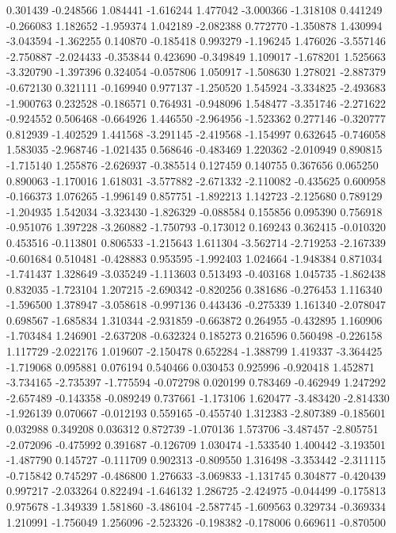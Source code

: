 0.301439
-0.248566
1.084441
-1.616244
1.477042
-3.000366
-1.318108
0.441249
-0.266083
1.182652
-1.959374
1.042189
-2.082388
0.772770
-1.350878
1.430994
-3.043594
-1.362255
0.140870
-0.185418
0.993279
-1.196245
1.476026
-3.557146
-2.750887
-2.024433
-0.353844
0.423690
-0.349849
1.109017
-1.678201
1.525663
-3.320790
-1.397396
0.324054
-0.057806
1.050917
-1.508630
1.278021
-2.887379
-0.672130
0.321111
-0.169940
0.977137
-1.250520
1.545924
-3.334825
-2.493683
-1.900763
0.232528
-0.186571
0.764931
-0.948096
1.548477
-3.351746
-2.271622
-0.924552
0.506468
-0.664926
1.446550
-2.964956
-1.523362
0.277146
-0.320777
0.812939
-1.402529
1.441568
-3.291145
-2.419568
-1.154997
0.632645
-0.746058
1.583035
-2.968746
-1.021435
0.568646
-0.483469
1.220362
-2.010949
0.890815
-1.715140
1.255876
-2.626937
-0.385514
0.127459
0.140755
0.367656
0.065250
0.890063
-1.170016
1.618031
-3.577882
-2.671332
-2.110082
-0.435625
0.600958
-0.166373
1.076265
-1.996149
0.857751
-1.892213
1.142723
-2.125680
0.789129
-1.204935
1.542034
-3.323430
-1.826329
-0.088584
0.155856
0.095390
0.756918
-0.951076
1.397228
-3.260882
-1.750793
-0.173012
0.169243
0.362415
-0.010320
0.453516
-0.113801
0.806533
-1.215643
1.611304
-3.562714
-2.719253
-2.167339
-0.601684
0.510481
-0.428883
0.953595
-1.992403
1.024664
-1.948384
0.871034
-1.741437
1.328649
-3.035249
-1.113603
0.513493
-0.403168
1.045735
-1.862438
0.832035
-1.723104
1.207215
-2.690342
-0.820256
0.381686
-0.276453
1.116340
-1.596500
1.378947
-3.058618
-0.997136
0.443436
-0.275339
1.161340
-2.078047
0.698567
-1.685834
1.310344
-2.931859
-0.663872
0.264955
-0.432895
1.160906
-1.703484
1.246901
-2.637208
-0.632324
0.185273
0.216596
0.560498
-0.226158
1.117729
-2.022176
1.019607
-2.150478
0.652284
-1.388799
1.419337
-3.364425
-1.719068
0.095881
0.076194
0.540466
0.030453
0.925996
-0.920418
1.452871
-3.734165
-2.735397
-1.775594
-0.072798
0.020199
0.783469
-0.462949
1.247292
-2.657489
-0.143358
-0.089249
0.737661
-1.173106
1.620477
-3.483420
-2.814330
-1.926139
0.070667
-0.012193
0.559165
-0.455740
1.312383
-2.807389
-0.185601
0.032988
0.349208
0.036312
0.872739
-1.070136
1.573706
-3.487457
-2.805751
-2.072096
-0.475992
0.391687
-0.126709
1.030474
-1.533540
1.400442
-3.193501
-1.487790
0.145727
-0.111709
0.902313
-0.809550
1.316498
-3.353442
-2.311115
-0.715842
0.745297
-0.486800
1.276633
-3.069833
-1.131745
0.304877
-0.420439
0.997217
-2.033264
0.822494
-1.646132
1.286725
-2.424975
-0.044499
-0.175813
0.975678
-1.349339
1.581860
-3.486104
-2.587745
-1.609563
0.329734
-0.369334
1.210991
-1.756049
1.256096
-2.523326
-0.198382
-0.178006
0.669611
-0.870500
